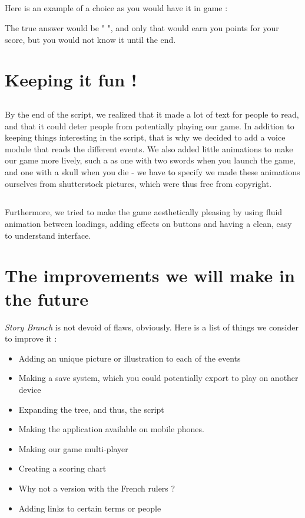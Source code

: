 \documentclass{scrreprt}
\begin{document}
\subsection*{} Here is an example of a choice as you would have it in game :




The true answer would be " ", and only that would earn you points for your score, but you would not know it until the end.

\newline
\section{Keeping it fun !}

\subsection*{} By the end of the script, we realized that it made a lot of text for people to read, and that it could deter people from potentially playing our game. In addition to keeping things interesting in the script, that is why we decided to add a voice module that reads the different events. We also added little animations to make our game more lively, such a as one with two swords when you launch the game, and one with a skull when you die - we have to specify we made these animations ourselves from shutterstock pictures, which were thus free from copyright.

\subsection*{}Furthermore, we tried to make the game aesthetically pleasing by using fluid animation between loadings, adding effects on buttons and having a clean, easy to understand interface.

\section{The improvements we will make in the future}

\textit{Story Branch} is not devoid of flaws, obviously. Here is a list of things we consider to improve it :
\begin{itemize}
\item Adding an unique picture or illustration to each of the events
\item Making a save system, which you could potentially export to play on another device
\item Expanding the tree, and thus, the script
\item Making the application available on mobile phones.
\item Making our game multi-player
\item Creating a scoring chart
\item Why not a version with the French rulers ?
\item Adding links to certain terms or people
\end{itemize}
\end{document}
